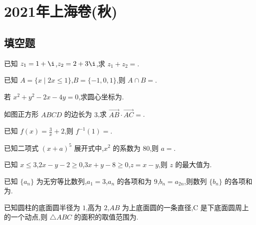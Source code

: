 
\chapter{2021年上海卷(秋)}

\section{填空题}

\begin{problem}
已知 \(z_1=1+\i\),\(z_2=2+3\i\),求 \(z_1+z_2=\)\fillinblank{}.
\end{problem}

\begin{problem}
已知 \(A=\{x\mid 2x\le 1\}\),\(B=\{-1,0,1\}\),则 \(A\cap B=\)\fillinblank{}.
\end{problem}

\begin{problem}
若 \(x^2+y^2-2x-4y=0\),求圆心坐标为\fillinblank{}.
\end{problem}

\begin{problem}
如图正方形 \(ABCD\) 的边长为 \(3\),求 \(\overrightarrow{AB}\cdot \overrightarrow{AC}=\)\fillinblank{}.

\end{problem}

\begin{problem}
已知 \(f(x)=\frac{3}{x}+2\),则 \(f^{-1}(1)=\)\fillinblank{}.
\end{problem}

\begin{problem}
已知二项式 \((x+a)^5\) 展开式中,\(x^2\) 的系数为 \(80\),则 \(a=\)\fillinblank{}.
\end{problem}

\begin{problem}
已知 \(x\le 3\),\(2x-y-2\ge 0\),\(3x+y-8\ge 0\),\(z=x-y\),则 \(z\) 的最大值为\fillinblank{}.
\end{problem}

\begin{problem}
已知 \(\{a_n\}\) 为无穷等比数列,\(a_1=3\),\(a_n\) 的各项和为 \(9\),\(b_n=a_{2n}\),则数列 \(\{b_n\}\) 的各项和为\fillinblank{}.
\end{problem}

\begin{problem}
已知圆柱的底面圆半径为 \(1\),高为 \(2\),\(AB\) 为上底面圆的一条直径,C 是下底面圆周上的一个动点,则 \(\triangle ABC\) 的面积的取值范围为\fillinblank{}.
\end{problem}


